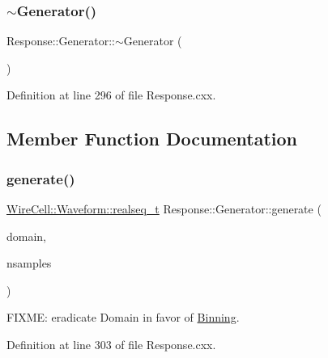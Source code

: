 \subsubsection{\texorpdfstring{$\sim$\+Generator()}{~Generator()}}
{\footnotesize\ttfamily Response\+::\+Generator\+::$\sim$\+Generator (\begin{DoxyParamCaption}{ }\end{DoxyParamCaption})\hspace{0.3cm}{\ttfamily [virtual]}}



Definition at line 296 of file Response.\+cxx.



\subsection{Member Function Documentation}
\mbox{\label{class_wire_cell_1_1_response_1_1_generator_aceed932e0bab5af1cb80981507667e5e}} 
\subsubsection{\texorpdfstring{generate()}{generate()}\hspace{0.1cm}{\footnotesize\ttfamily [1/2]}}
{\footnotesize\ttfamily \hyperlink{namespace_wire_cell_1_1_waveform_a479175e541c8545e87cd8063b74b6956}{Wire\+Cell\+::\+Waveform\+::realseq\+\_\+t} Response\+::\+Generator\+::generate (\begin{DoxyParamCaption}\item[{const \hyperlink{namespace_wire_cell_1_1_waveform_aa783b1c2a84242349d5c798b7483727b}{Wire\+Cell\+::\+Waveform\+::\+Domain} \&}]{domain,  }\item[{int}]{nsamples }\end{DoxyParamCaption})}



F\+I\+X\+ME\+: eradicate Domain in favor of \hyperlink{class_wire_cell_1_1_binning}{Binning}. 



Definition at line 303 of file Response.\+cxx.

